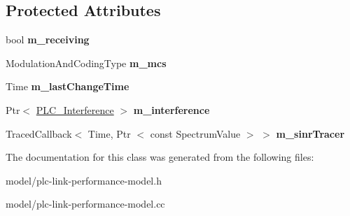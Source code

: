 \subsection*{\-Protected \-Attributes}
\begin{DoxyCompactItemize}
\item 
\hypertarget{classns3_1_1PLC__LinkPerformanceModel_a5eef722f3fcdce65e12fe548cb862d9e}{bool {\bfseries m\-\_\-receiving}}\label{classns3_1_1PLC__LinkPerformanceModel_a5eef722f3fcdce65e12fe548cb862d9e}

\item 
\hypertarget{classns3_1_1PLC__LinkPerformanceModel_a97d1adfe95b6c68f26caddc964774e4e}{\-Modulation\-And\-Coding\-Type {\bfseries m\-\_\-mcs}}\label{classns3_1_1PLC__LinkPerformanceModel_a97d1adfe95b6c68f26caddc964774e4e}

\item 
\hypertarget{classns3_1_1PLC__LinkPerformanceModel_a2aa7c2ab56df7f3cf3b19dcbdb11d27c}{\-Time {\bfseries m\-\_\-last\-Change\-Time}}\label{classns3_1_1PLC__LinkPerformanceModel_a2aa7c2ab56df7f3cf3b19dcbdb11d27c}

\item 
\hypertarget{classns3_1_1PLC__LinkPerformanceModel_a5a4a6f8c14309211cefb1b6c075e8f01}{\-Ptr$<$ \hyperlink{classns3_1_1PLC__Interference}{\-P\-L\-C\-\_\-\-Interference} $>$ {\bfseries m\-\_\-interference}}\label{classns3_1_1PLC__LinkPerformanceModel_a5a4a6f8c14309211cefb1b6c075e8f01}

\item 
\hypertarget{classns3_1_1PLC__LinkPerformanceModel_a6d98235e0c7396e855ec918406af325a}{\-Traced\-Callback$<$ \-Time, \-Ptr\*
$<$ const \-Spectrum\-Value $>$ $>$ {\bfseries m\-\_\-sinr\-Tracer}}\label{classns3_1_1PLC__LinkPerformanceModel_a6d98235e0c7396e855ec918406af325a}

\end{DoxyCompactItemize}


\-The documentation for this class was generated from the following files\-:\begin{DoxyCompactItemize}
\item 
model/plc-\/link-\/performance-\/model.\-h\item 
model/plc-\/link-\/performance-\/model.\-cc\end{DoxyCompactItemize}
